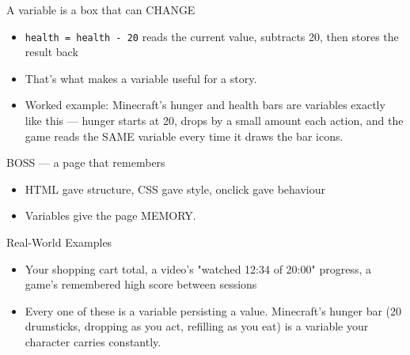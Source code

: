 \documentclass[aspectratio=169]{beamer}
\begin{document}
\begin{frame}{A variable is a box that can CHANGE}
    \large
    \begin{itemize}
        \item \texttt{health = health - 20} reads the current value, subtracts 20, then stores the result back
        \item That's what makes a variable useful for a story.
        \item Worked example: Minecraft's hunger and health bars are variables exactly like this — hunger starts at 20, drops by a small amount each action, and the game reads the SAME variable every time it draws the bar icons.
    \end{itemize}

    \begin{center}
    \end{center}
\end{frame}


\begin{frame}{BOSS — a page that remembers}
    \large
    \begin{itemize}
        \item HTML gave structure, CSS gave style, onclick gave behaviour
        \item Variables give the page MEMORY.
    \end{itemize}
\end{frame}

\begin{frame}{Real-World Examples}
    \large
    \begin{itemize}
        \item Your shopping cart total, a video's "watched 12:34 of 20:00" progress, a game's remembered high score between sessions
        \item Every one of these is a variable persisting a value. Minecraft's hunger bar (20 drumsticks, dropping as you act, refilling as you eat) is a variable your character carries constantly.
    \end{itemize}
\end{frame}
\end{document}
